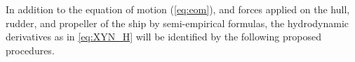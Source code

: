 \noindent In addition to the equation of motion (\autoref{eq:eom}), and forces applied on the hull, rudder, and propeller of the ship by semi-empirical formulas, the hydrodynamic derivatives as in \autoref{eq:XYN_H} will be identified by the following proposed procedures.
